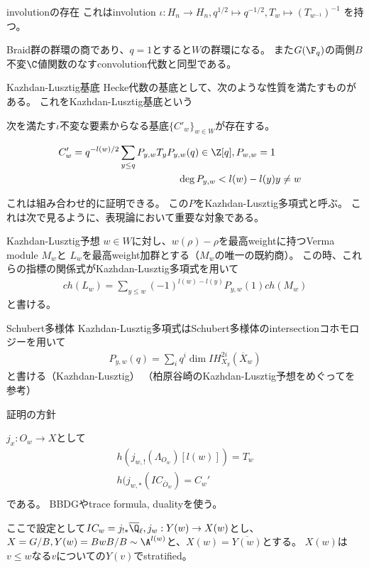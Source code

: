 \documentclass[dvipdfmx]{beamer}
\begin{document}
\begin{frame}{involutionの存在}
  これはinvolution $\iota:H_n \to H_n, q^{1/2} \mapsto q^{-1/2}, T_w\mapsto(T_{w^{-1}})^{-1}$
  を持つ。

  Braid群の群環の商であり、$q=1$とすると$W$の群環になる。
  また$G(\F_q)$の両側$B$不変$\C$値関数のなすconvolution代数と同型である。
\end{frame}

\begin{frame}{Kazhdan-Lusztig基底}
  Hecke代数の基底として、次のような性質を満たすものがある。
  これをKazhdan-Lusztig基底という
  \begin{prop}
    次を満たす$\iota$不変な要素からなる基底$\{C'_w\}_{w\in W}$が存在する。
    
    \begin{align*}
      C'_w=q^{-l(w)/2}\sum_{y\leq q}P_{y,w}T_y
      P_{y,w}(q)\in\Z[q], P_{w,w}=1\\
      \deg P_{y,w}<l(w)-l(y)&y\neq w
    \end{align*}
  \end{prop}
  これは組み合わせ的に証明できる。
  この$P$をKazhdan-Lusztig多項式と呼ぶ。
  これは次で見るように、表現論において重要な対象である。
\end{frame}

\begin{frame}{Kazhdan-Lusztig予想}
  $w\in W$に対し、$w(\rho)-\rho$を最高weightに持つVerma module $M_w$と
  $L_w$を最高weight加群とする（$M_w$の唯一の既約商）。
  この時、これらの指標の関係式がKazhdan-Lusztig多項式を用いて
  \begin{align*}
    ch(L_w)=\sum_{y\leq w}(-1)^{l(w)-l(y)}P_{y,w}(1)ch(M_w)
  \end{align*}
  と書ける。
\end{frame}

\begin{frame}{Schubert多様体}
  Kazhdan-Lusztig多項式はSchubert多様体のintersectionコホモロジーを用いて
  \begin{align*}
    P_{y,w}(q)=\sum_iq^i\dim IH_{X_y}^{2i}(\overline{X}_w)
  \end{align*}
  と書ける（Kazhdan-Lusztig）
  （柏原谷崎のKazhdan-Lusztig予想をめぐってを参考）

  証明の方針

  $j_x:O_w\to X$として
  \begin{align*}
    h(j_{w,!}(\Lambda_{O_w})[l(w)])=T_w\\
    h(j_{w,*}(IC_{\bar{O}_w})=C_w'\\
  \end{align*}
  である。
  BBDGやtrace formula, dualityを使う。

  ここで設定として$IC_w=j_{!*}\overline{\Q}_\ell, j_w:Y(w)\to X(w)$とし、
  $X=G/B, Y(w)=BwB/B \sim \A^{l(w)}$と、$X(w)=\overline{Y(w)}$とする。
  $X(w)$は$v\leq w$なる$v$についての$Y(v)$でstratified。
\end{frame}
\end{document}

